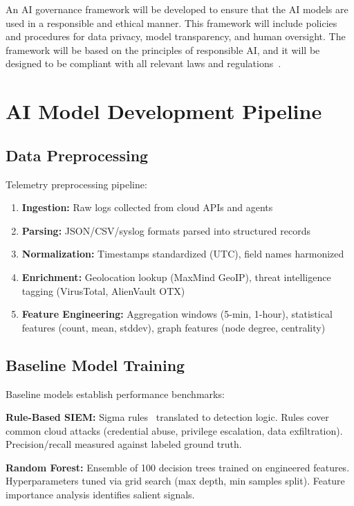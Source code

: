 An AI governance framework will be developed to ensure that the AI models are used in a responsible and ethical manner. This framework will include policies and procedures for data privacy, model transparency, and human oversight. The framework will be based on the principles of responsible AI, and it will be designed to be compliant with all relevant laws and regulations~\cite{researchgate2024aigovernance}.

\section{AI Model Development Pipeline}\label{sec:method-aidev}
\subsection{Data Preprocessing}
Telemetry preprocessing pipeline:
\begin{enumerate}
    \item \textbf{Ingestion:} Raw logs collected from cloud APIs and agents
    \item \textbf{Parsing:} JSON/CSV/syslog formats parsed into structured records
    \item \textbf{Normalization:} Timestamps standardized (UTC), field names harmonized
    \item \textbf{Enrichment:} Geolocation lookup (MaxMind GeoIP), threat intelligence tagging (VirusTotal, AlienVault OTX)
    \item \textbf{Feature Engineering:} Aggregation windows (5-min, 1-hour), statistical features (count, mean, stddev), graph features (node degree, centrality)
\end{enumerate}

\subsection{Baseline Model Training}
Baseline models establish performance benchmarks:

\textbf{Rule-Based SIEM:} Sigma rules~\cite{sigma2023} translated to detection logic. Rules cover common cloud attacks (credential abuse, privilege escalation, data exfiltration). Precision/recall measured against labeled ground truth.

\textbf{Random Forest:} Ensemble of 100 decision trees trained on engineered features. Hyperparameters tuned via grid search (max depth, min samples split). Feature importance analysis identifies salient signals.

